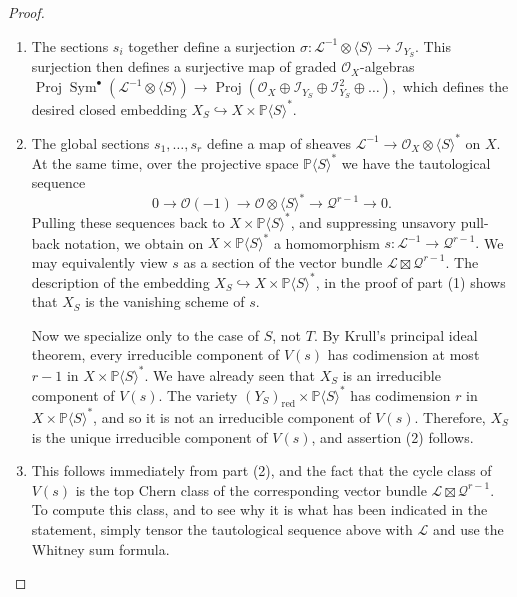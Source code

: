 \documentclass[12pt]{article}
\theoremstyle{plain}
\theoremstyle{remark}
\renewcommand{\P}{\mathbb{P}}
\newcommand{\Sym}{\operatorname{Sym}}
\newcommand{\Proj}{\operatorname{Proj}}
\renewcommand{\O}{\mathscr{O}}
\renewcommand{\L}{\mathscr{L}}
\newcommand{\QQ}{\mathscr{Q}}
\newcommand{\I}{\mathcal{I}}
\newcommand{\red}{\operatorname{red}}
\begin{document}
    \begin{proof}
        \label{proof:resolution}
        \begin{enumerate}
        \item The sections $s_i$ together define a surjection $\sigma: \L^{-1}\otimes \langle S \rangle \to \I_{Y_{S}}.$ This surjection then defines a surjective map of graded $\O_X$-algebras $\Proj \Sym^{\bullet}(\L^{-1}\otimes \langle S \rangle) \to \Proj (\O_X \oplus \I_{Y_{S}} \oplus \I_{Y_{S}}^{2} \oplus \dots),$ which defines the desired closed embedding $X_{S} \hookrightarrow X \times \P \langle S \rangle^{*}$.
        \item   The global sections $s_1 ,\dots, s_r$ define a map of sheaves $\L^{-1} \to \O_{X} \otimes \langle S \rangle^{*}$ on $X$.   At the same time, over the projective space $\P \langle S \rangle^{*}$ we have the tautological sequence
        \[
            0 \to \O(-1) \to \O \otimes \langle S \rangle^{*} \to \QQ^{r-1} \to 0.
        \]
        Pulling these sequences back to $X \times \P \langle S \rangle^{*}$, and suppressing unsavory pull-back notation, we obtain on $X \times \P \langle S \rangle^{*}$ a homomorphism $s : \L^{-1} \to \QQ^{r-1}.$ We may equivalently view $s$ as a section of the vector bundle $\L \boxtimes \QQ^{r-1}$.  The description  of the embedding $X_S \hookrightarrow X \times \P \langle S \rangle^{*}$, in the proof of part (1) shows that $X_S$ is the vanishing scheme of $s$.

        Now we specialize only to the case of $S$, not $T$. By Krull's principal ideal theorem, every irreducible component of $V(s)$ has codimension at most $r-1$ in $X \times \P \langle S \rangle^{*}$.  We have already seen that $X_{S}$ is an irreducible component of $V(s)$.  The variety $(Y_{S})_{\red} \times \P \langle S \rangle^{*}$  has codimension $r$ in $X \times \P \langle S \rangle^{*}$, and so it is not an irreducible component of $V(s)$.  Therefore, $X_{S}$ is the unique irreducible component of $V(s)$, and assertion (2) follows.

        \item This follows immediately from part (2), and the fact that the cycle class of $V(s)$ is the top Chern class of the corresponding vector bundle $\L \boxtimes \QQ^{r-1}$.  To compute this class, and to see why it is what has been indicated in the statement, simply tensor the tautological sequence above with $\L$ and use the Whitney sum formula.


\end{enumerate}
\end{proof}
\end{document}
